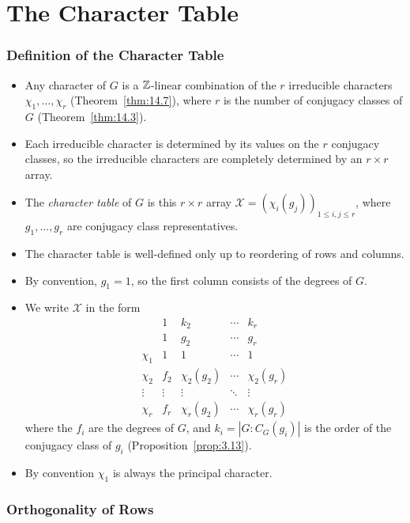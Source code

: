 \documentclass[../Odyssey_Project.tex]{subfiles}
\begin{document}
\setcounter{section}{14}
\section{The Character Table}

\subsubsection*{Definition of the Character Table}
\begin{itemize}
    \item Any character of $G$ is a $\mathbb{Z}$-linear combination of the $r$ irreducible characters $\chi_1, \ldots, \chi_r$ (Theorem~\ref{thm:14.7}), where $r$ is the number of conjugacy classes of $G$ (Theorem~\ref{thm:14.3}).
    \item Each irreducible character is determined by its values on the $r$ conjugacy classes, so the irreducible characters are completely determined by an $r \times r$ array.
    \item The \emph{character table} of $G$ is this $r \times r$ array $\mathcal{X} = (\chi_i(g_j))_{1 \leq i,j \leq r}$, where $g_1, \ldots, g_r$ are conjugacy class representatives.
    \item The character table is well-defined only up to reordering of rows and columns.
    \item By convention, $g_1 = 1$, so the first column consists of the degrees of $G$.
    \item We write $\mathcal{X}$ in the form
    \[
        \begin{array}{c|cccc}
            & 1 & k_2 & \cdots & k_r \\
            & 1 & g_2 & \cdots & g_r \\
            \hline
            \chi_1 & 1 & 1 & \cdots & 1 \\
            \chi_2 & f_2 & \chi_2(g_2) & \cdots & \chi_2(g_r) \\
            \vdots & \vdots & \vdots & \ddots & \vdots \\
            \chi_r & f_r & \chi_r(g_2) & \cdots & \chi_r(g_r)
        \end{array}
    \]
    where the $f_i$ are the degrees of $G$, and $k_i = |G : C_G(g_i)|$ is the order of the conjugacy class of $g_i$ (Proposition~\ref{prop:3.13}).
    \item By convention $\chi_1$ is always the principal character.
\end{itemize}

\subsubsection*{Orthogonality of Rows}
\end{document}
